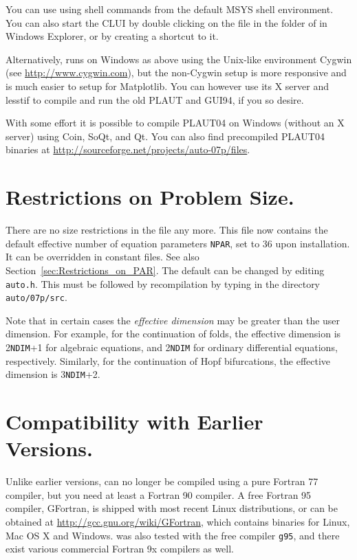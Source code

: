 \documentclass[12pt]{report}
\begin{document}
You can use \AUTO using shell commands from the default MSYS shell
environment. You can also start the CLUI by double clicking on the file
 in the  folder of \AUTO in Windows Explorer,
or by creating a shortcut to it.

Alternatively, \AUTO runs on Windows as above using the Unix-like
environment Cygwin (see \url{http://www.cygwin.com}), but the
non-Cygwin setup is more responsive and is much easier to setup for
Matplotlib. You can however use its X server and lesstif to compile
and run the old {\cal PLAUT} and GUI94, if you so desire.

With some effort it is possible to compile {\cal PLAUT04}
on Windows (without an X server) using Coin, SoQt, and Qt. You can
also find precompiled {\cal PLAUT04} binaries at
\url{http://sourceforge.net/projects/auto-07p/files}.

\section{ Restrictions on Problem Size.} \label{sec:Restrictions}
There are no size restrictions in the file  any more. This file now contains the
default effective number of equation parameters {\tt NPAR}, set to 36
upon installation. It can be overridden in constant files.
See also Section~\ref{sec:Restrictions_on_PAR}.
The default can be changed by editing {\tt auto.h}.
This must be followed by recompilation by typing  
in the directory {\tt auto/07p/src}.

Note that in certain cases the {\it effective dimension} may be greater
than the user dimension.
For example, for the continuation of folds,
the effective dimension is 2{\tt NDIM}+1 for algebraic equations,
and 2{\tt NDIM} for ordinary differential equations, respectively.
Similarly, for the continuation of Hopf bifurcations,
the effective dimension is 3{\tt NDIM}+2.
 
 
\section{ Compatibility with Earlier Versions.} \label{sec:Compatibility}
Unlike earlier versions, \AUTO can no longer be compiled using a pure
Fortran 77 compiler, but you need at least a Fortran 90 compiler.
A free Fortran 95 compiler, GFortran, is shipped with most recent
Linux distributions, or can be obtained at
\url{http://gcc.gnu.org/wiki/GFortran}, which contains binaries for
Linux, Mac OS X and Windows. \AUTO was also tested with the free
compiler {\tt g95}, and there exist various commercial Fortran
9x compilers as well.
\end{document}

